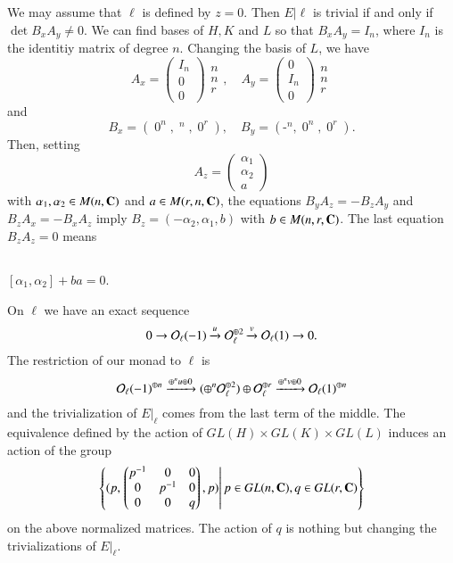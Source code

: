 We may assume that $\ell$ is defined by $z=0$. Then $E |\ell$ is trivial if and only if $\det B_{x}A_{y} \neq 0$. We can find bases of $H, K$ and $L$ so that $B_{x}A_{y} = I_{n}$, where $I_{n}$ is the identitiy matrix of degree $n$. Changing the basis of $L$, we have
$$
A_{x}= \begin{pmatrix}
I_{n}\\
0\\
0
\end{pmatrix}
\begin{matrix}
n\\
n\\
r
\end{matrix}
,\quad
A_{y}=\begin{pmatrix}
0\\
I_{n}\\
0
\end{pmatrix}
\begin{matrix}
n\\
n\\
r
\end{matrix}
$$
and
$$
\displaystyle B_{x}=(\mathop{0}^{n}, \mathop{I_{n}}^{n}, \mathop{0}^{r}), \quad \displaystyle B_{y}=(\mathop{-I_{n}}^{n}, \mathop{0}^{n}, \mathop{0}^{r}).
$$
Then, setting
$$
A_{z}=\begin{pmatrix}
\alpha_{1}\\
\alpha_{2}\\
a
\end{pmatrix}
$$
with $\alpha_{1} ,\alpha_{2} \in M(n, \mathbf{C})$ and $a \in M(r,n,\mathbf{C})$, the equations $B_{y}A_{z} = -B_{z}A_{y}$ and $B_{z}A_{x} = -B_{x}A_{z}$ imply $B_{z}=(-\alpha_{2}, \alpha_{1},b)$ with $b \in M(n,r,\mathbf{C})$. The last equation $B_{z}A_{z} = 0$ means
 
\subsection{}\label{art12-subsec-1.2}
$[\alpha_{1}, \alpha_{2}] + ba =0$.

On $\ell$ we have an exact sequence
$$
0 \rightarrow \mathcal{O}_{\ell}(-1)\xrightarrow{u}\mathcal{O}_{\ell}^{\oplus 2} \xrightarrow{v}\mathcal{O}_{\ell}(1) \rightarrow 0.
$$
The restriction of our monad to $\ell$ is
$$
\mathcal{O}_{\ell}(-1)^{\oplus n} \xrightarrow{\oplus^{n}u\oplus 0}(\oplus^{n}\mathcal{O}_{\ell}^{\oplus 2}) \oplus \mathcal{O}_{\ell}^{\oplus r} \xrightarrow{\oplus^{n}v\oplus 0} \mathcal{O}_{\ell}(1)^{\oplus n}
$$
and the trivialization of $E|_{\ell}$ comes from the last term of the middle. The equivalence defined by the action of $GL(H) \times GL(K) \times GL(L)$ induces an action of the group
$$
\left\{(p,\left. \begin{pmatrix}
p^{-1} & 0 & 0\\
0 & p^{-1} & 0\\
0 &  0 & q
\end{pmatrix}, p) \right| p \in GL(n, \mathbf{C}), q \in GL(r, \mathbf{C})\right\}
$$
on the above normalized matrices. The action of $q$ is nothing but changing the trivializations of $E|_{\ell}$.

